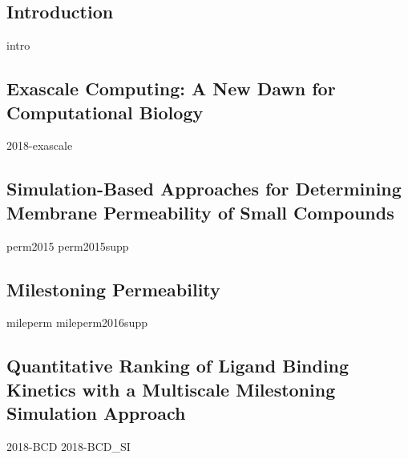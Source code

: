 \documentclass[11pt, chapterheads, final]{ucsd}
\theoremstyle{definition}
\begin{document}
%


\begin{refsection}
\chapter{Introduction}
{intro}
\printbibliography[segment=\therefsegment,heading=subbibintoc]{}
\end{refsection}

\newpage
\begin{refsection}
\chapter{Exascale Computing: A New Dawn for Computational Biology}\label{chap:exascale}
{2018-exascale}
\printbibliography[segment=\therefsegment,heading=subbibintoc]{}
\end{refsection}

\newpage
\begin{refsection}
\chapter{Simulation-Based Approaches for Determining Membrane Permeability of Small Compounds}\label{chap:permeability}
{perm2015}
{perm2015supp}
\printbibliography[segment=\therefsegment,heading=subbibintoc]{}
\end{refsection}

\newpage
\begin{refsection}
\chapter{Milestoning Permeability}\label{chap:mileperm}
{mileperm}
{mileperm2016supp}
\printbibliography[segment=\therefsegment,heading=subbibintoc]{}
\end{refsection}


\newpage
\begin{refsection}
\chapter{Quantitative Ranking of Ligand Binding Kinetics with a Multiscale Milestoning Simulation Approach}\label{chap:bcd}
{2018-BCD}
{2018-BCD_SI}
\printbibliography[segment=\therefsegment,heading=subbibintoc]{}
\end{refsection}
\end{document}
